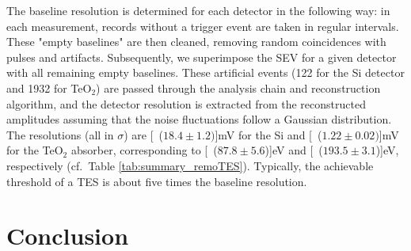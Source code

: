\documentclass[superscriptaddress,nofootinbib ]{revtex4-2}
\begin{document}
The baseline resolution is determined for each detector in the following way: in each measurement, records without a trigger event are taken in regular intervals. These "empty baselines" are then cleaned, removing random coincidences with pulses and artifacts. Subsequently, we superimpose the SEV for a given detector with all remaining empty baselines. These artificial events (122 for the Si detector and 1932 for TeO$_2$) are passed through the analysis chain and reconstruction algorithm, and the detector resolution is extracted from the reconstructed amplitudes assuming that the noise fluctuations follow a Gaussian distribution. The resolutions (all in $\sigma$) are \unit[($18.4\pm1.2)$]{mV} for the Si and \unit[($1.22\pm 0.02)$]{mV} for the TeO$_2$ absorber, corresponding to \unit[($87.8\pm5.6$)]{eV} and  \unit[($193.5\pm3.1$)]{eV}, respectively (cf.~Table \ref{tab:summary_remoTES}). Typically, the achievable threshold of a TES is about five times the baseline resolution.


\section{Conclusion}
\end{document}
